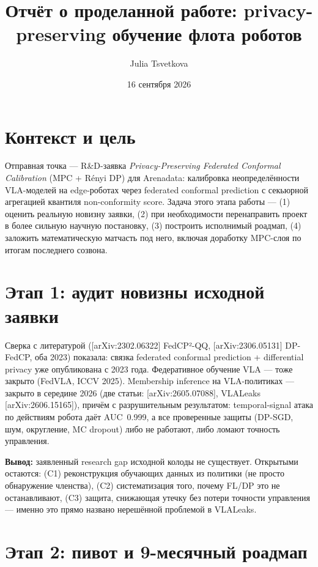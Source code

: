 \documentclass[11pt]{article}
\title{Отчёт о проделанной работе: privacy-preserving обучение флота роботов}
\author{Julia Tsvetkova}
\date{16 сентября 2026}
\begin{document}
\maketitle
\tableofcontents

\section{Контекст и цель}

Отправная точка — R\&D-заявка \emph{Privacy-Preserving Federated Conformal
Calibration} (MPC + Rényi DP) для Arenadata: калибровка неопределённости VLA-моделей
на edge-роботах через federated conformal prediction с секьюрной агрегацией
квантиля non-conformity score. Задача этого этапа работы — (1) оценить реальную
новизну заявки, (2) при необходимости перенаправить проект в более сильную научную
постановку, (3) построить исполнимый роадмап, (4) заложить математическую матчасть
под него, включая доработку MPC-слоя по итогам последнего созвона.

\section{Этап 1: аудит новизны исходной заявки}

Сверка с литературой ([arXiv:2302.06322] FedCP²-QQ, [arXiv:2306.05131] DP-FedCP,
оба 2023) показала: связка federated conformal prediction + differential privacy
уже опубликована с 2023 года. Федеративное обучение VLA — тоже закрыто (FedVLA,
ICCV 2025). Membership inference на VLA-политиках — закрыто в середине 2026
(две статьи: [arXiv:2605.07088], VLALeaks [arXiv:2606.15165]), причём с разрушительным
результатом: temporal-signal атака по действиям робота даёт AUC~0.999, а все
проверенные защиты (DP-SGD, шум, округление, MC dropout) либо не работают, либо
ломают точность управления.

\textbf{Вывод:} заявленный \guillemotleft research gap\guillemotright{} исходной
колоды не существует. Открытыми остаются: (C1) реконструкция обучающих данных из
политики (не просто обнаружение членства), (C2) систематизация того, почему FL/DP
это не останавливают, (C3) защита, снижающая утечку без потери точности управления
— именно это прямо названо нерешённой проблемой в VLALeaks.

\section{Этап 2: пивот и 9-месячный роадмап}
\end{document}
